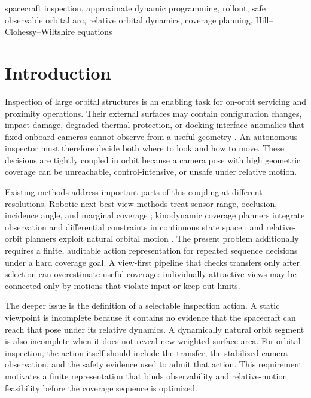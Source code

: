 \documentclass{IEEEtaes}
\theoremstyle{remark}
\theoremstyle{plain}
\begin{document}
\begin{IEEEkeywords}
spacecraft inspection, approximate dynamic programming, rollout, safe observable orbital arc, relative orbital dynamics, coverage planning, Hill--Clohessy--Wiltshire equations
\end{IEEEkeywords}

\section{Introduction}
\label{sec:introduction}

Inspection of large orbital structures is an enabling task for on-orbit servicing and proximity operations. Their external surfaces may contain configuration changes, impact damage, degraded thermal protection, or docking-interface anomalies that fixed onboard cameras cannot observe from a useful geometry \cite{faghihi2022kinodynamic,faghihi2023multiple,apodaca2025trajectory}. An autonomous inspector must therefore decide both where to look and how to move. These decisions are tightly coupled in orbit because a camera pose with high geometric coverage can be unreachable, control-intensive, or unsafe under relative motion.

Existing methods address important parts of this coupling at different resolutions. Robotic next-best-view methods treat sensor range, occlusion, incidence angle, and marginal coverage \cite{scott2003view}; kinodynamic coverage planners integrate observation and differential constraints in continuous state space \cite{faghihi2022kinodynamic,faghihi2023multiple}; and relative-orbit planners exploit natural orbital motion \cite{hou2024relative,deka2023astrodynamics}. The present problem additionally requires a finite, auditable action representation for repeated sequence decisions under a hard coverage goal. A view-first pipeline that checks transfers only after selection can overestimate useful coverage: individually attractive views may be connected only by motions that violate input or keep-out limits.

The deeper issue is the definition of a selectable inspection action. A static viewpoint is incomplete because it contains no evidence that the spacecraft can reach that pose under its relative dynamics. A dynamically natural orbit segment is also incomplete when it does not reveal new weighted surface area. For orbital inspection, the action itself should include the transfer, the stabilized camera observation, and the safety evidence used to admit that action. This requirement motivates a finite representation that binds observability and relative-motion feasibility before the coverage sequence is optimized.
\end{document}
